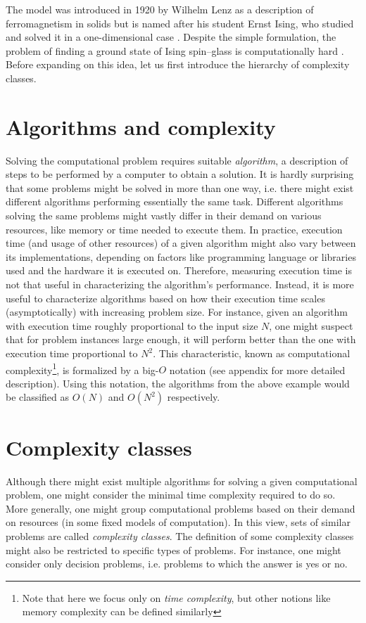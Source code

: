 The model was introduced in 1920 by Wilhelm Lenz \cite{lenz} as a description of ferromagnetism in solids but is named after his student Ernst Ising, who studied and solved it in a one-dimensional case \cite{ising}. Despite the simple formulation, the problem of finding a ground state of Ising spin--glass is computationally hard \cite{barahoma}. Before expanding on this idea, let us first introduce the hierarchy of complexity classes.

\section{Algorithms and complexity}
Solving the computational problem requires suitable \emph{algorithm}, a description of steps to be performed by a computer to obtain a solution. It is hardly surprising that some problems might be solved in more than one way, i.e. there might exist different algorithms performing essentially the same task. Different algorithms solving the same problems might vastly differ in their demand on various resources, like memory or time needed to execute them. In practice, execution time (and usage of other resources) of a given algorithm might also vary between its implementations, depending on factors like programming language or libraries used and the hardware it is executed on. Therefore, measuring execution time is not that useful in characterizing the algorithm's performance.  Instead, it is more useful to characterize algorithms based on how their execution time scales (asymptotically) with increasing problem size. For instance, given an algorithm with execution time roughly proportional to the input size $N$, one might suspect that for problem instances large enough, it will perform better than the one with execution time proportional to $N^{2}$. This characteristic, known as computational complexity\footnote{Note that here we focus only on \emph{time complexity}, but other notions like memory complexity can be defined similarly}, is formalized by a big-$O$ notation (see appendix for more detailed description). Using this notation, the algorithms from the above example would be classified as $O(N)$ and $O(N^{2})$ respectively.

\section{Complexity classes}
Although there might exist multiple algorithms for solving a given computational problem, one might consider the minimal time complexity required to do so. More generally, one might group computational problems based on their demand on resources (in some fixed models of computation). In this view, sets of similar problems are called \emph{complexity classes}. The definition of some complexity classes might also be restricted to specific types of problems. For instance, one might consider only decision problems, i.e. problems to which the answer is yes or no.

